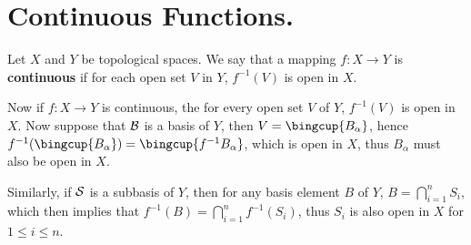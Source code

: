 
\section{Continuous Functions.}

\begin{definition}
    Let $X$ and  $Y$ be topological spaces. We say that a mapping $f:X
    \rightarrow Y$ is  \textbf{continuous} if for each open set $V$ in  $Y$,
    $f^{-1}(V)$ is open in $X$.
\end{definition}

Now if $f:X \rightarrow Y$ is continuous, the for every open set  $V$ of  $Y$,
$f^{-1}(V)$ is open in  $X$. Now suppose that  $\mathcal{B}$ is a basis of  $Y$, then
$V=\bingcup{B_{\alpha}}$, hence
$f^{-1}(\bingcup{B_{\alpha}})=\bingcup{f^{-1}{B_{\alpha}}}$, which is open in
$X$, thus  $B_{\alpha}$ must also be open in  $X$. 

Similarly, if $\mathcal{S}$ is a subbasis of  $Y$, then for any basis element  $B$ of
$Y$,  $B=\bigcap_{i=1}^{n}{S_i}$, which then implies that
$f^{-1}(B)=\bigcap_{i=1}^{n}{f^{-1}(S_i)}$, thus  $S_i$ is also open in  $X$ for
 $1 \leq i \leq n$.

